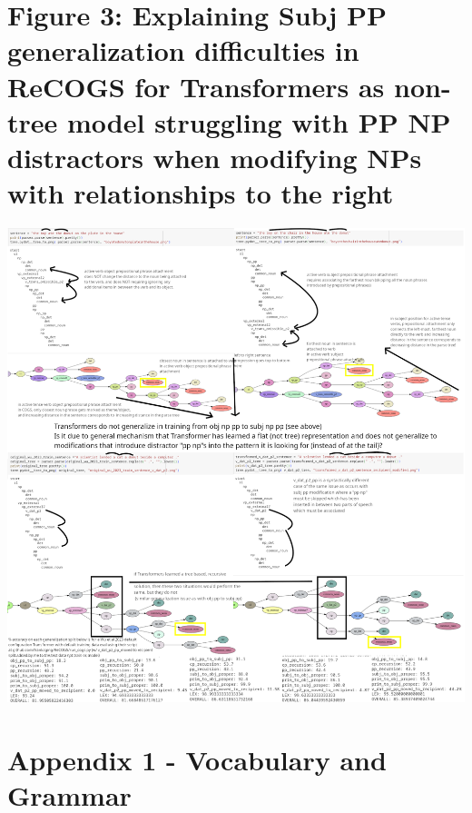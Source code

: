 \documentclass[11pt]{article}
\begin{document}
\clearpage
\section{Figure 3: Explaining Subj PP generalization difficulties in ReCOGS for Transformers as non-tree model struggling with PP NP distractors when modifying NPs with relationships to the right}
\includegraphics[scale=0.25]{possible_issue_with_subj_pp_generalization_by_transformers_could_be_simple_nontree_pp_np_distractor_when_modifying_nps_with_related_nps_to_right.png}

\clearpage
\section{Appendix 1 - Vocabulary and Grammar}
\end{document}
